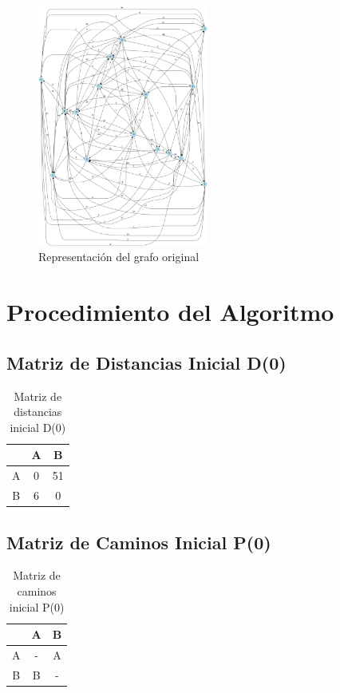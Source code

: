 \documentclass[12pt]{article}
\begin{document}
\begin{figure}[h!]
\centering
\includegraphics[width=0.5\textwidth,keepaspectratio]{grafo.png}
\caption{Representación del grafo original}
\end{figure}

\clearpage
\section{Procedimiento del Algoritmo}
\subsection{Matriz de Distancias Inicial D(0)}
\begin{table}[h!]
\centering
\begin{tabular}{|c|c|c|}
\hline
 & A & B \\\hline
A & 0 & 51 \\\hline
B & 6 & 0 \\\hline
\end{tabular}
\caption{Matriz de distancias inicial D(0)}
\end{table}

\clearpage
\subsection{Matriz de Caminos Inicial P(0)}
\begin{table}[h!]
\centering
\begin{tabular}{|c|c|c|}
\hline
 & A & B \\\hline
A & - & A \\\hline
B & B & - \\\hline
\end{tabular}
\caption{Matriz de caminos inicial P(0)}
\end{table}
\end{document}

